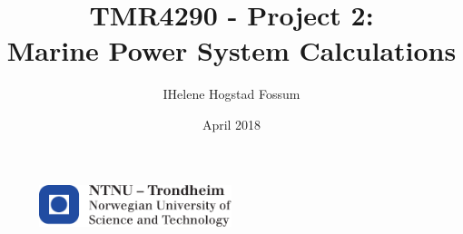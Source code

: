\documentclass{article}
\author{IHelene Hogstad Fossum}
\date{April 2018}
\title{TMR4290 - Project 2: \\ Marine Power System Calculations}
\begin{document}
\begin{titlepage} 
    \maketitle
    \begin{figure}
    \centering
    \includegraphics[width=0.5\textwidth]{utils/logontnu_eng}
    \end{figure}
    
\end{titlepage}

\newpage
\thispagestyle{empty}




\end{document}
